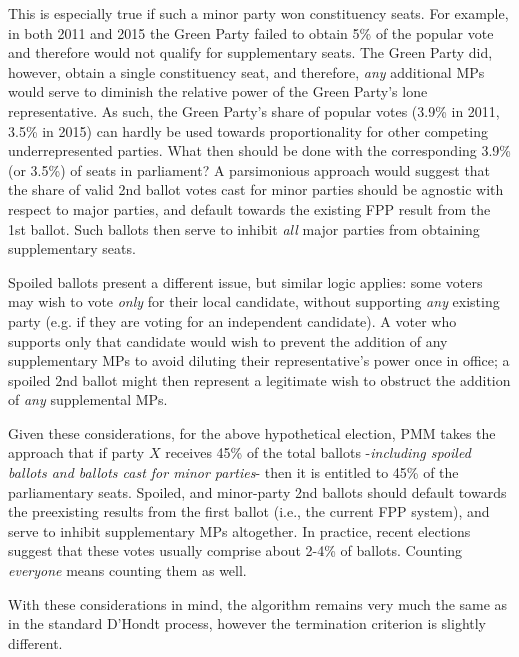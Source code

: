 This is especially true if such a minor party won constituency seats. For example, in both 2011 and 2015 the Green Party failed to obtain 5\% of the popular vote and therefore would not qualify for supplementary seats. The Green Party did, however, obtain a single constituency seat, and therefore, \emph{any} additional MPs would serve to diminish the relative power of the Green Party's lone representative.
As such, the Green Party’s share of popular votes (3.9\% in 2011, 3.5\% in 2015) can hardly be used towards proportionality for other competing underrepresented parties. What then should be done with the corresponding 3.9\% (or 3.5\%) of seats in parliament? 
A parsimonious approach would suggest that the share of valid 2nd ballot votes cast for minor parties should be agnostic with respect to major parties, and default towards the existing FPP result from the 1st ballot. Such ballots then serve to inhibit \emph{all} major parties from obtaining supplementary seats.

Spoiled ballots present a different issue, but similar logic applies: some voters may wish to vote \emph{only} for their local candidate, without supporting \emph{any} existing party (e.g. if they are voting for an independent candidate).
A voter who supports only that candidate would wish to prevent the addition of any supplementary MPs to avoid diluting their representative's power once in office; a spoiled 2nd ballot might then represent a legitimate wish to obstruct the addition of \emph{any} supplemental MPs.

Given these considerations, for the above hypothetical election, PMM takes the approach that if party $X$ receives 45\% of the total ballots \--\emph{including spoiled ballots and ballots cast for minor parties}\-- then it is entitled to 45\% of the parliamentary seats.
Spoiled, and minor-party 2nd ballots should default towards the preexisting results from the first ballot (i.e., the current FPP system), and serve to inhibit supplementary MPs altogether.
In practice, recent elections suggest that these votes usually comprise about 2-4\% of ballots. Counting \emph{everyone} means counting them as well.

With these considerations in mind, the algorithm remains very much the same as in the standard D'Hondt process, however the termination criterion is slightly different.

